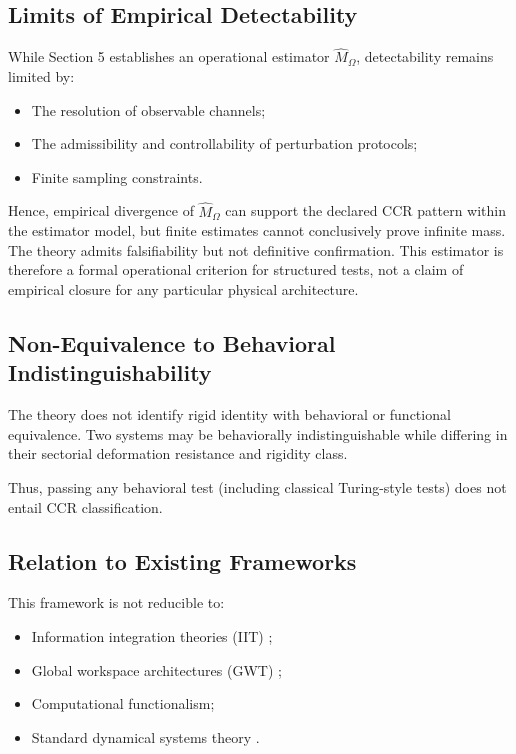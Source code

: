 \documentclass[11pt,a4paper]{article}
\theoremstyle{plain}
\theoremstyle{definition}
\theoremstyle{remark}
\begin{document}
\subsection{Limits of Empirical Detectability}

While Section 5 establishes an operational estimator $\hat{M}_\Omega$, detectability remains limited by:
\begin{itemize}[leftmargin=*]
    \item The resolution of observable channels;
    \item The admissibility and controllability of perturbation protocols;
    \item Finite sampling constraints.
\end{itemize}

Hence, empirical divergence of $\hat{M}_\Omega$ can support the declared CCR pattern within the estimator model, but finite estimates cannot conclusively prove infinite mass. The theory admits falsifiability but not definitive confirmation.
This estimator is therefore a formal operational criterion for structured tests, not a claim of empirical closure for any particular physical architecture.

\subsection{Non-Equivalence to Behavioral Indistinguishability}

The theory does not identify rigid identity with behavioral or functional equivalence. Two systems may be behaviorally indistinguishable while differing in their sectorial deformation resistance and rigidity class.

Thus, passing any behavioral test (including classical Turing-style tests) does not entail CCR classification.

\subsection{Relation to Existing Frameworks}

This framework is not reducible to:
\begin{itemize}[leftmargin=*]
    \item Information integration theories (IIT) \cite{tononi2004};
    \item Global workspace architectures (GWT) \cite{baars1988};
    \item Computational functionalism;
    \item Standard dynamical systems theory \cite{katok1995}.
\end{itemize}
\end{document}
